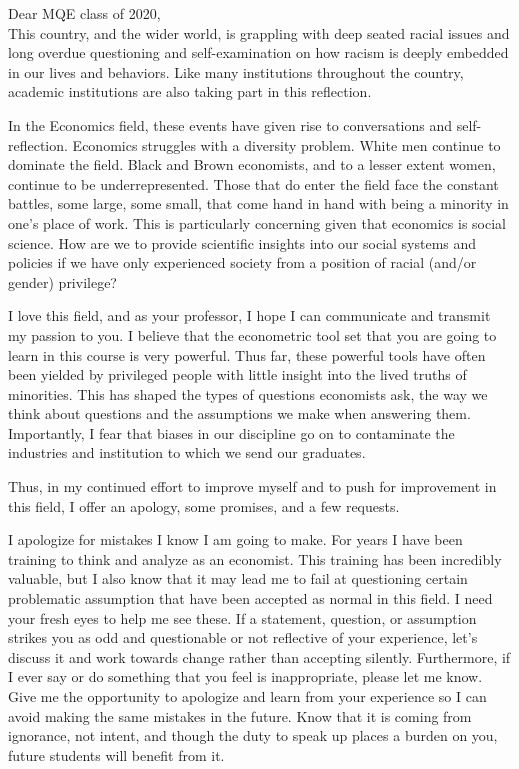 \documentclass[a4paper, 10pt]{article}
\begin{document}
\vspace{10mm}
\linespread{1.25}
\bigskip
Dear MQE class of 2020,\\ 


This country, and the wider world, is grappling with deep seated racial issues and long overdue questioning and self-examination on how racism is deeply embedded in our lives and behaviors. Like many institutions throughout the country, academic institutions are also taking part in this reflection. 

In the Economics field, these events have given rise to conversations and self-reflection. Economics struggles with a diversity problem. White men continue to dominate the field. Black and Brown economists, and to a lesser extent women, continue to be underrepresented. Those that do enter the field face the constant battles, some large, some small, that come hand in hand with being a minority in one's place of work. This is particularly concerning given that economics is social science. How are we to provide scientific insights into our social systems and policies if we have only experienced society from a position of racial (and/or gender) privilege?

I love this field, and as your professor, I hope I can communicate and transmit my passion to you. I believe that the econometric tool set that you are going to learn in this course is very powerful. Thus far, these powerful tools have often been yielded by privileged people with little insight into the lived truths of minorities. This has shaped the types of questions economists ask, the way we think about questions and the assumptions we make when answering them. Importantly, I fear that biases in our discipline go on to contaminate the industries and institution to which we send our graduates. 

Thus, in my continued effort to improve myself and to push for improvement in this field, I offer an apology, some promises, and a few requests.  


I apologize for mistakes I know I am going to make. For years I have been training to think and analyze as an economist. This training has been incredibly valuable, but I also know that it may lead me to fail at questioning certain problematic assumption that have been accepted as normal in this field.  I need your fresh eyes to help me see these. If a statement, question, or assumption strikes you as odd and questionable or not reflective of your experience, let's discuss it and work towards change rather than accepting silently. Furthermore, if I ever say or do something that you feel is inappropriate, please let me know. Give me the opportunity to apologize and learn from your experience so I can avoid making the same mistakes in the future. Know that it is coming from ignorance, not intent, and though the duty to speak up places a burden on you, future students will benefit from it.
\end{document}
